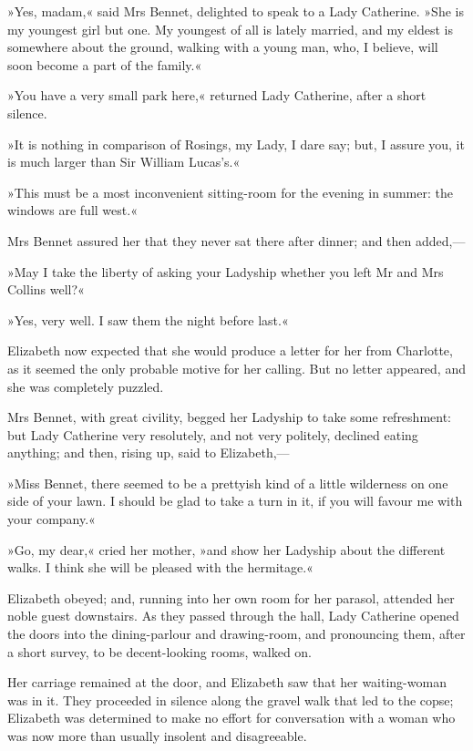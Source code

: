 »Yes, madam,« said Mrs Bennet, delighted to speak to a Lady Catherine. »She is my youngest girl but one. My youngest of all is lately married, and my eldest is somewhere about the ground, walking with a young man, who, I believe, will soon become a part of the family.«

»You have a very small park here,« returned Lady Catherine, after a short silence.

»It is nothing in comparison of Rosings, my Lady, I dare say; but, I assure you, it is much larger than Sir William Lucas's.«

»This must be a most inconvenient sitting-room for the evening in summer: the windows are full west.«

Mrs Bennet assured her that they never sat there after dinner; and then added,—

»May I take the liberty of asking your Ladyship whether you left Mr and Mrs Collins well?«

»Yes, very well. I saw them the night before last.«

Elizabeth now expected that she would produce a letter for her from Charlotte, as it seemed the only probable motive for her calling. But no letter appeared, and she was completely puzzled.

Mrs Bennet, with great civility, begged her Ladyship to take some refreshment: but Lady Catherine very resolutely, and not very politely, declined eating anything; and then, rising up, said to Elizabeth,—

»Miss Bennet, there seemed to be a prettyish kind of a little wilderness on one side of your lawn. I should be glad to take a turn in it, if you will favour me with your company.«

»Go, my dear,« cried her mother, »and show her Ladyship about the different walks. I think she will be pleased with the hermitage.«

Elizabeth obeyed; and, running into her own room for her parasol, attended her noble guest downstairs. As they passed through the hall, Lady Catherine opened the doors into the dining-parlour and drawing-room, and pronouncing them, after a short survey, to be decent-looking rooms, walked on.

Her carriage remained at the door, and Elizabeth saw that her waiting-woman was in it. They proceeded in silence along the gravel walk that led to the copse; Elizabeth was determined to make no effort for conversation with a woman who was now more than usually insolent and disagreeable.

